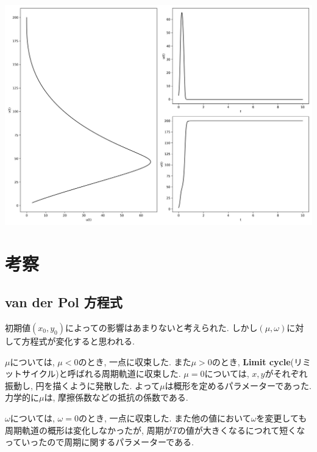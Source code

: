 \documentclass[12pt,a4paper]{jsarticle}
\makeatletter
\def\figcaption{\def\@captype{figure}\caption}
\makeatother
\begin{document}
\figcaption{$u_0=3.00, v_0=3.00, a_1=23.20, b_1=-0.60, c_1=-0.40, a_2=18.80, b_2=-0.50, c_2=-0.30, T = 10, N = 2000$}
\includegraphics[scale=0.33]{u3,0v3,0a125,0b1-0,1c1-0,4a220,0b2-0,2c2-0,1t1,00e+01n2,00e+03.png}
\figcaption{$u_0=3.00, v_0=3.00, a_1=25.00, b_1=-0.10, c_1=-0.40, a_2=20.00, b_2=-0.20, c_2=-0.10, T = 10, N = 2000$}


\section{考察}
\subsection{van der Pol 方程式}
初期値$(x_0, y_0)$によっての影響はあまりないと考えられた. しかし$(\mu, \omega)$に対して方程式が変化すると思われる.

$\mu$については, $\mu < 0$のとき, 一点に収束した. また$\mu > 0$のとき, \textbf{Limit cycle}(リミットサイクル)と呼ばれる周期軌道に収束した. $\mu = 0$については, $x, y$がそれぞれ振動し, 円を描くように発散した. よって$\mu$は概形を定めるパラメーターであった. 力学的に$\mu$は, 摩擦係数などの抵抗の係数である.

$\omega$については, $\omega = 0$のとき, 一点に収束した. また他の値において$\omega$を変更しても周期軌道の概形は変化しなかったが, 周期が$T$の値が大きくなるにつれて短くなっていったので周期に関するパラメーターである.
\end{document}
